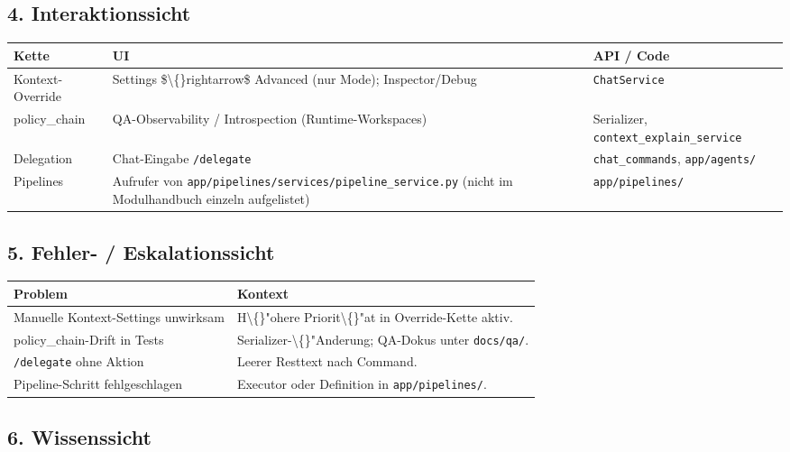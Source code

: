 \subsection{4. Interaktionssicht}

\begin{center}
\begin{tabular}{lll}
\hline
Kette & UI & API / Code \\
\hline
Kontext-Override & Settings \$\textbackslash\{\}rightarrow\$ Advanced (nur Mode); Inspector/Debug & \texttt{ChatService} \\
policy\_chain & QA-Observability / Introspection (Runtime-Workspaces) & Serializer, \texttt{context\_explain\_service} \\
Delegation & Chat-Eingabe \texttt{/delegate} & \texttt{chat\_commands}, \texttt{app/agents/} \\
Pipelines & Aufrufer von \texttt{app/pipelines/services/pipeline\_service.py} (nicht im Modulhandbuch einzeln aufgelistet) & \texttt{app/pipelines/} \\
\hline
\end{tabular}
\end{center}

\subsection{5. Fehler- / Eskalationssicht}

\begin{center}
\begin{tabular}{ll}
\hline
Problem & Kontext \\
\hline
Manuelle Kontext-Settings unwirksam & H\textbackslash\{\}"ohere Priorit\textbackslash\{\}"at in Override-Kette aktiv. \\
policy\_chain-Drift in Tests & Serializer-\textbackslash\{\}"Anderung; QA-Dokus unter \texttt{docs/qa/}. \\
\texttt{/delegate} ohne Aktion & Leerer Resttext nach Command. \\
Pipeline-Schritt fehlgeschlagen & Executor oder Definition in \texttt{app/pipelines/}. \\
\hline
\end{tabular}
\end{center}

\subsection{6. Wissenssicht}

